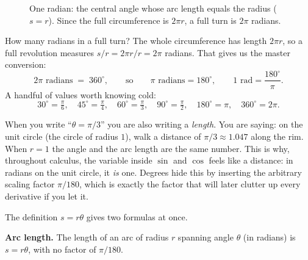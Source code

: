 \begin{figure}[htbp]
\centering
{}
\caption{One radian: the central angle whose arc length equals the radius ($s = r$). Since the full circumference is $2\pi r$, a full turn is $2\pi$ radians.}
\label{ch04:fig-radian}
\end{figure}

How many radians in a full turn? The whole circumference has length $2\pi r$, so a full revolution measures $s/r = 2\pi r / r = 2\pi$ radians. That gives us the master conversion:
\[
  2\pi \text{ radians} \;=\; 360^\circ,
  \qquad\text{so}\qquad
  \pi \text{ radians} = 180^\circ,
  \qquad
  1 \text{ rad} = \frac{180^\circ}{\pi}.
\]
A handful of values worth knowing cold:
\[
  30^\circ = \tfrac{\pi}{6},\quad
  45^\circ = \tfrac{\pi}{4},\quad
  60^\circ = \tfrac{\pi}{3},\quad
  90^\circ = \tfrac{\pi}{2},\quad
  180^\circ = \pi,\quad
  360^\circ = 2\pi.
\]

\begin{happeningbox}
When you write ``$\theta = \pi/3$'' you are also writing a \emph{length}. You are saying: on the unit circle (the circle of radius $1$), walk a distance of $\pi/3 \approx 1.047$ along the rim. When $r=1$ the angle and the arc length are the same number. This is why, throughout calculus, the variable inside $\sin$ and $\cos$ feels like a distance: in radians on the unit circle, it \emph{is} one. Degrees hide this by inserting the arbitrary scaling factor $\pi/180$, which is exactly the factor that will later clutter up every derivative if you let it.
\end{happeningbox}

The definition $s = r\theta$ gives two formulas at once.

\textbf{Arc length.} The length of an arc of radius $r$ spanning angle $\theta$ (in radians) is $s = r\theta$, with no factor of $\pi/180$.

